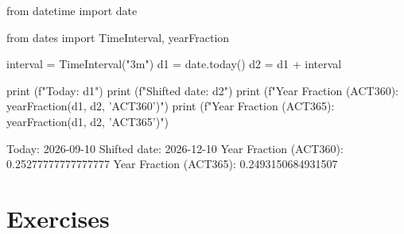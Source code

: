 
\begin{ipythonnon}
from datetime import date

from dates import TimeInterval, yearFraction

interval = TimeInterval("3m")
d1 = date.today()
d2 = d1 + interval

print (f"Today: {d1}")
print (f"Shifted date: {d2}")
print (f"Year Fraction (ACT360): {yearFraction(d1, d2, 'ACT360')}")
print (f"Year Fraction (ACT365): {yearFraction(d1, d2, 'ACT365')}")
\end{ipythonnon}
\begin{ioutput}
Today: 2026-09-10
Shifted date: 2026-12-10
Year Fraction (ACT360): 0.25277777777777777
Year Fraction (ACT365): 0.2493150684931507
\end{ioutput}

\section*{Exercises}

